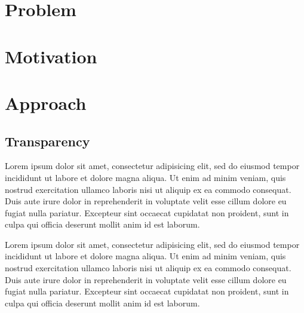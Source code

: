 \documentclass[a0,landscape]{a0poster}
\begin{document}
\begin{multicols}{3}
\color{Black}
\section*{Problem}






\section*{Motivation}




\vfill\null
\columnbreak




\section*{Approach}


\color{MidnightBlue}
\subsection*{Transparency}
\color{Black}

% 
Lorem ipsum dolor sit amet, consectetur adipisicing elit, sed do eiusmod
tempor incididunt ut labore et dolore magna aliqua. Ut enim ad minim veniam,
quis nostrud exercitation ullamco laboris nisi ut aliquip ex ea commodo
consequat. Duis aute irure dolor in reprehenderit in voluptate velit esse
cillum dolore eu fugiat nulla pariatur. Excepteur sint occaecat cupidatat non
proident, sunt in culpa qui officia deserunt mollit anim id est laborum.

Lorem ipsum dolor sit amet, consectetur adipisicing elit, sed do eiusmod
tempor incididunt ut labore et dolore magna aliqua. Ut enim ad minim veniam,
quis nostrud exercitation ullamco laboris nisi ut aliquip ex ea commodo
consequat. Duis aute irure dolor in reprehenderit in voluptate velit esse
cillum dolore eu fugiat nulla pariatur. Excepteur sint occaecat cupidatat non
proident, sunt in culpa qui officia deserunt mollit anim id est laborum.


\end{multicols}
\end{document}
